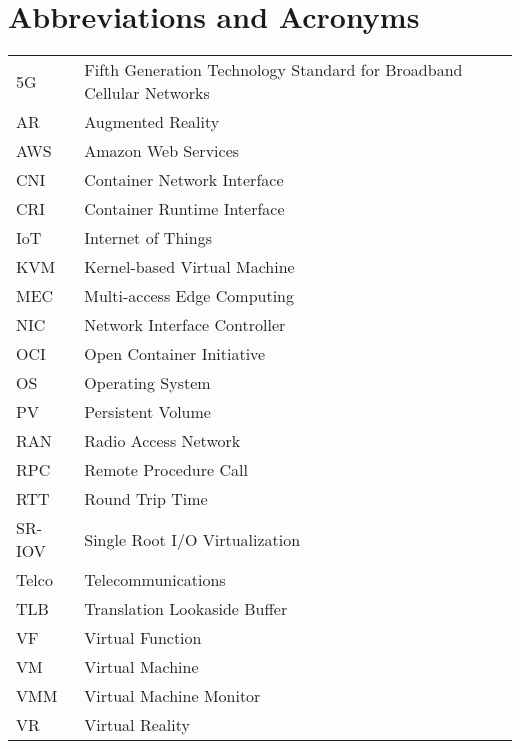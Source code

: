 \chapter*{Abbreviations and Acronyms}

\noindent
\begin{longtable}{@{}p{}p{}@{}}
5G & Fifth Generation Technology Standard for Broadband Cellular Networks \\
AR & Augmented Reality \\
AWS & Amazon Web Services \\
CNI & Container Network Interface \\
CRI & Container Runtime Interface \\
IoT & Internet of Things \\
KVM & Kernel-based Virtual Machine \\
MEC & Multi-access Edge Computing \\
NIC & Network Interface Controller \\
OCI & Open Container Initiative \\
OS & Operating System \\
PV & Persistent Volume \\
RAN & Radio Access Network \\
RPC & Remote Procedure Call \\
RTT & Round Trip Time \\
SR-IOV & Single Root I/O Virtualization \\
Telco & Telecommunications \\
TLB & Translation Lookaside Buffer \\
VF & Virtual Function \\
VM & Virtual Machine \\
VMM & Virtual Machine Monitor \\
VR & Virtual Reality\\
\end{longtable}
